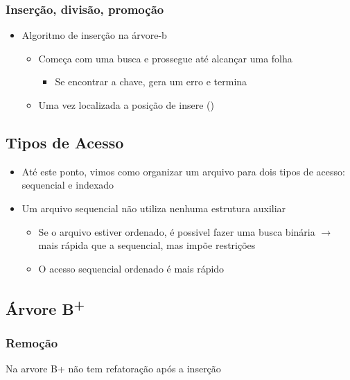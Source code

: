 \documentclass[12pt]{article}
\begin{document}
        \subsubsection{Inserção, divisão, promoção}
        \begin{itemize}
            \item Algoritmo de inserção na árvore-b
            \begin{itemize}
                \item Começa com uma busca e prossegue até alcançar uma folha
                \begin{itemize}
                    \item Se encontrar a chave, gera um erro e termina
                \end{itemize}
                \item Uma vez localizada a posição de insere ()
            \end{itemize}
        \end{itemize}
    \subsection{Tipos de Acesso}
    \begin{itemize}
        \item Até este ponto, vimos como organizar um arquivo para dois tipos 
        de acesso: sequencial e indexado
        \item Um arquivo sequencial não utiliza nenhuma estrutura auxiliar
        \begin{itemize}
            \item Se o arquivo estiver ordenado, é possivel fazer uma busca 
            binária $\rightarrow$ mais rápida que a sequencial, mas impõe 
            restrições
            \item O acesso sequencial ordenado é mais rápido
        \end{itemize}
    \end{itemize}
    \subsection[Árvore B+]{Árvore B\textsuperscript{+}}
        \subsubsection{Remoção}
    Na arvore B+ não tem refatoração após a inserção

    
\end{document}
